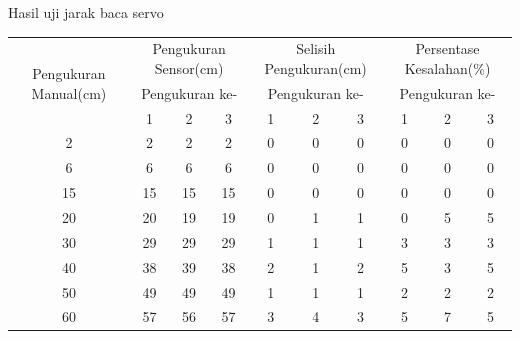 \begin{atable} 
    \caption{Hasil uji jarak baca servo}
    \label{table:tableUjiServo}
    \begin{tabular}{|c|c|c|c|c|c|c|c|c|c|}
    \hline
    \multirow{3}{2cm}{Pengukuran Manual(cm)} & \multicolumn{3}{c|}{Pengukuran Sensor(cm)} & \multicolumn{3}{c|}{Selisih Pengukuran(cm)} & \multicolumn{3}{c|}{Persentase Kesalahan(\%)} \\ \cline{2-10} 
                                       & \multicolumn{3}{c|}{Pengukuran ke-}         & \multicolumn{3}{c|}{Pengukuran ke-}          & \multicolumn{3}{c|}{Pengukuran ke-}       \\ \cline{2-10} 
                                       & 1             & 2            & 3            & 1             & 2             & 3            & 1            & 2            & 3           \\ \hline
    2                                  & 2             & 2            & 2            & 0             & 0             & 0            & 0            & 0            & 0           \\ \hline
    6                                  & 6             & 6            & 6            & 0             & 0             & 0            & 0            & 0            & 0           \\ \hline
    15                                 & 15            & 15           & 15           & 0             & 0             & 0            & 0            & 0            & 0           \\ \hline
    20                                 & 20            & 19           & 19           & 0             & 1             & 1            & 0            & 5            & 5           \\ \hline
    30                                 & 29            & 29           & 29           & 1             & 1             & 1            & 3            & 3            & 3           \\ \hline
    40                                 & 38            & 39           & 38           & 2             & 1             & 2            & 5            & 3            & 5           \\ \hline
    50                                 & 49            & 49           & 49           & 1             & 1             & 1            & 2            & 2            & 2           \\ \hline
    60                                 & 57            & 56           & 57           & 3             & 4             & 3            & 5            & 7            & 5           \\ \hline

\end{tabular}
\end{atable}
